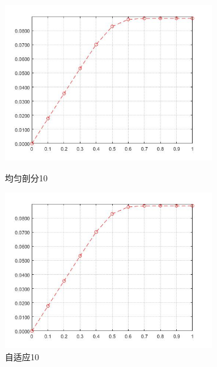 \documentclass[12pt,fontset=mac]{ctexart}
\begin{document}
\begin{figure}[H]
	\centering
	\begin{minipage}[t]{0.48\textwidth}
		\centering
		\includegraphics[width=9cm]{方程一，均匀剖分10.jpg}
		\caption{均匀剖分10}
	\end{minipage}
	\begin{minipage}[t]{0.48\textwidth}
		\centering
		\includegraphics[width=9cm]{方程一，自适应10.jpg}
		\caption{自适应10}
	\end{minipage}
\end{figure}
\end{document}
